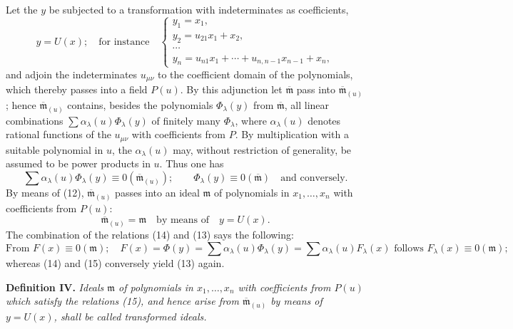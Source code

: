 \documentclass[11pt]{article}
\providecommand{\mideal}{\mathfrak m}
\providecommand{\zero}[1]{\equiv 0(#1)}
\providecommand{\mideal}{\mathfrak m}
\providecommand{\zero}[1]{\equiv 0\pmod{#1}}
\begin{document}
Let the $y$ be subjected to a transformation with indeterminates as coefficients,
\begin{equation}
 y=U(x);\quad \text{for instance}\quad
 \begin{cases}
 y_1=x_1,\\
 y_2=u_{21}x_1+x_2,\\
 \cdots\\
 y_n=u_{n1}x_1+\cdots+u_{n,n-1}x_{n-1}+x_n,
 \end{cases}
\tag{12}
\end{equation}
and adjoin the indeterminates $u_{\mu\nu}$ to the coefficient domain of the polynomials, which thereby passes into a field $P(u)$. By this adjunction let $\overline{\mideal}$ pass into $\overline{\mideal}_{(u)}$; hence $\overline{\mideal}_{(u)}$ contains, besides the polynomials $\Phi_\lambda(y)$ from $\overline{\mideal}$, all linear combinations $\sum \alpha_\lambda(u)\Phi_\lambda(y)$ of finitely many $\Phi_\lambda$, where $\alpha_\lambda(u)$ denotes rational functions of the $u_{\mu\nu}$ with coefficients from $P$. By multiplication with a suitable polynomial in $u$, the $\alpha_\lambda(u)$ may, without restriction of generality, be assumed to be power products in $u$. Thus one has
\begin{equation}
 \sum \alpha_\lambda(u)\Phi_\lambda(y)\zero{\overline{\mideal}_{(u)}};
 \qquad
 \Phi_\lambda(y)\zero{\overline{\mideal}}\quad\text{and conversely}.
\tag{13}
\end{equation}
By means of (12), $\overline{\mideal}_{(u)}$ passes into an ideal $\mideal$ of polynomials in $x_1,\ldots,x_n$ with coefficients from $P(u)$:
\begin{equation}
 \overline{\mideal}_{(u)}=\mideal\quad \text{by means of}\quad y=U(x).
\tag{14}
\end{equation}
The combination of the relations (14) and (13) says the following:
\begin{equation}
 \text{From } F(x)\zero{\mideal};\quad
 F(x)=\Phi(y)=\sum \alpha_\lambda(u)\Phi_\lambda(y)=\sum \alpha_\lambda(u)F_\lambda(x)
 \text{ follows } F_\lambda(x)\zero{\mideal};
\tag{15}
\end{equation}
whereas (14) and (15) conversely yield (13) again.

\medskip
\noindent\textbf{Definition IV.} \emph{Ideals $\mideal$ of polynomials in $x_1,\ldots,x_n$ with coefficients from $P(u)$ which satisfy the relations (15), and hence arise from $\overline{\mideal}_{(u)}$ by means of $y=U(x)$, shall be called transformed ideals.}
\end{document}
